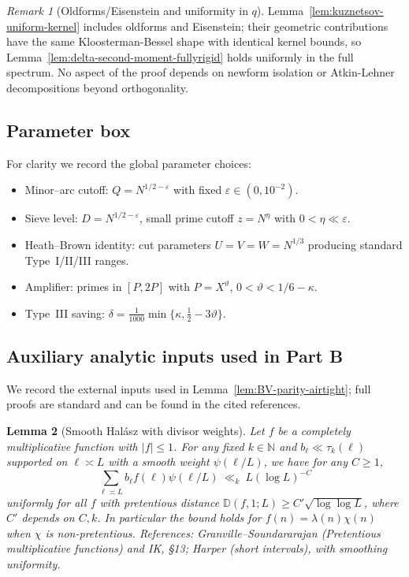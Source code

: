 \documentclass[11pt]{article}
\newtheorem{lemma}{Lemma}[part]
\theoremstyle{definition}
\theoremstyle{remark}
\newtheorem{remark}[lemma]{Remark}
\numberwithin{equation}{part}
\begin{document}
\begin{remark}[Oldforms/Eisenstein and uniformity in $q$]
	Lemma~\ref{lem:kuznetsov-uniform-kernel} includes oldforms and Eisenstein; their geometric contributions have the same Kloosterman-Bessel shape with identical kernel bounds, so Lemma~\ref{lem:delta-second-moment-fullyrigid} holds uniformly in the full spectrum. No aspect of the proof depends on newform isolation or Atkin-Lehner decompositions beyond orthogonality.
\end{remark}

\subsection{Parameter box}

For clarity we record the global parameter choices:
\begin{itemize}
	\item Minor--arc cutoff: $Q=N^{1/2-\varepsilon}$ with fixed $\varepsilon\in(0,10^{-2})$.
	\item Sieve level: $D=N^{1/2-\varepsilon}$, small prime cutoff $z=N^\eta$ with $0<\eta\ll\varepsilon$.
	\item Heath--Brown identity: cut parameters $U=V=W=N^{1/3}$ producing standard Type~I/II/III ranges.
	\item Amplifier: primes in $[P,2P]$ with $P=X^\vartheta$, $0<\vartheta<1/6-\kappa$.
	\item Type~III saving: $\delta=\tfrac{1}{1000}\min\{\kappa,\tfrac12-3\vartheta\}$.
\end{itemize}
\subsection{Auxiliary analytic inputs used in Part B}

We record the external inputs used in Lemma~\ref{lem:BV-parity-airtight}; full proofs are standard and can be found in the cited references.

\begin{lemma}[Smooth Hal\'asz with divisor weights]\label{lem:halasz-smooth}
	Let $f$ be a completely multiplicative function with $|f|\le 1$. For any fixed $k\in\mathbb N$ and $b_\ell\ll \tau_k(\ell)$ supported on $\ell\asymp L$ with a smooth weight $\psi(\ell/L)$, we have for any $C\ge 1$,
	\[
		\sum_{\ell\asymp L} b_\ell f(\ell)\psi(\ell/L)\ \ll_{k}\ L(\log L)^{-C}
	\]
	uniformly for all $f$ with pretentious distance $\mathbb D(f,1;L)\ge C'\sqrt{\log\log L}$, where $C'$ depends on $C,k$. In particular the bound holds for $f(n)=\lambda(n)\chi(n)$ when $\chi$ is non-pretentious. References: Granville--Soundararajan (Pretentious multiplicative functions) and IK, §13; Harper (short intervals), with smoothing uniformity.
\end{lemma}
\end{document}
